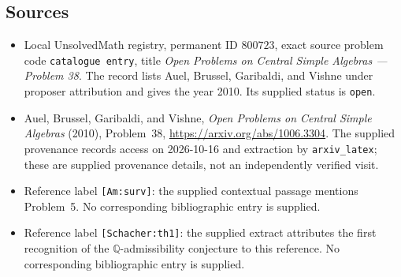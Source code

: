 \documentclass[11pt]{article}
\newcommand{\Q}{\mathbb{Q}}
\begin{document}
\subsection{Sources}
\begin{itemize}
\item Local UnsolvedMath registry, permanent ID \(800723\), exact source problem code \texttt{catalogue entry}, title \emph{Open Problems on Central Simple Algebras --- Problem 38}. The record lists Auel, Brussel, Garibaldi, and Vishne under proposer attribution and gives the year 2010. Its supplied status is \texttt{open}.
\item Auel, Brussel, Garibaldi, and Vishne, \emph{Open Problems on Central Simple Algebras} (2010), Problem~38, \url{https://arxiv.org/abs/1006.3304}. The supplied provenance records access on 2026-10-16 and extraction by \texttt{arxiv\_latex}; these are supplied provenance details, not an independently verified visit.
\item Reference label \texttt{[Am:surv]}: the supplied contextual passage mentions Problem~5. No corresponding bibliographic entry is supplied.
\item Reference label \texttt{[Schacher:th1]}: the supplied extract attributes the first recognition of the \(\Q\)-admissibility conjecture to this reference. No corresponding bibliographic entry is supplied.
\end{itemize}
\end{document}
